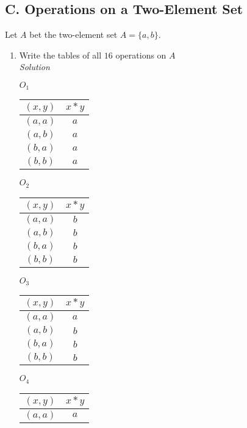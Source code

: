 \documentclass[12pt]{article}
\begin{document}
\begin{flushleft}
\section*{C. Operations on a Two-Element Set}
Let $A$ bet the two-element set $A = \{a,b\}.$
	\begin{enumerate}
		\item Write the tables of all $16$ operations on $A$ \\
		\medskip
			\textit{Solution} \\
			\medskip
			\begin{minipage}[h]{.2\textwidth}
				$O_1$
    		\begin{tabular}{ c | c }
      		$(x,y)$ & $x*y$ \\
        	\hline
        	$(a,a)$ & $a$ \\
        	$(a,b)$ & $a$ \\
        	$(b,a)$ & $a$ \\
        	$(b,b)$ & $a$
      	\end{tabular}
    	\end{minipage}
    	\bigskip
      \begin{minipage}[h]{.2\textwidth}
				$O_2$
    		\begin{tabular}{ c | c }
      		$(x,y)$ & $x*y$ \\
        	\hline
        	$(a,a)$ & $b$ \\
        	$(a,b)$ & $b$ \\
        	$(b,a)$ & $b$ \\
        	$(b,b)$ & $b$
      	\end{tabular}
    	\end{minipage}
      \begin{minipage}[h]{.2\textwidth}
				$O_3$
    		\begin{tabular}{ c | c }
      		$(x,y)$ & $x*y$ \\
        	\hline
        	$(a,a)$ & $a$ \\
        	$(a,b)$ & $b$ \\
        	$(b,a)$ & $b$ \\
        	$(b,b)$ & $b$
      	\end{tabular}
    	\end{minipage}        
      \begin{minipage}[h]{.2\textwidth}
				$O_4$
    		\begin{tabular}{ c | c }
      		$(x,y)$ & $x*y$ \\
        	\hline
        	$(a,a)$ & $a$ \\

\end{tabular}
\end{minipage}
\end{enumerate}
\end{flushleft}
\end{document}
